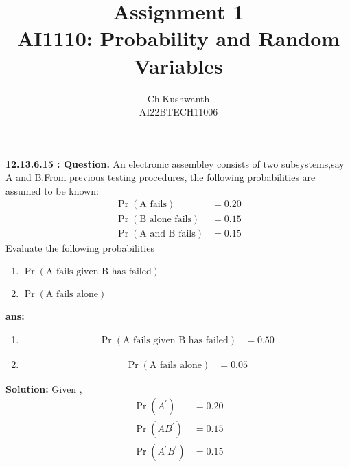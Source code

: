 \documentclass[journal,12pt,twocolumn]{IEEEtran}
\title{\textbf{Assignment 1}
\\ \textbf{AI1110:} Probability and Random Variables}
\author{Ch.Kushwanth
\\ AI22BTECH11006}
\providecommand{\pr}[1]{\ensuremath{\Pr\left(#1\right)}}
\theoremstyle{remark}
\begin{document}
\maketitle
\textbf{12.13.6.15 : Question.}
An electronic assembley consists of two subsystems,say A and B.From previous testing procedures, the following probabilities are assumed to be known:
\begin{align}
\pr{\text{A fails}}&=0.20
\\ \pr{\text{B alone fails}}&=0.15
\\ \pr{\text{A  and B fails}}&=0.15
\end{align}
 Evaluate the following probabilities
 \begin{enumerate}
 \item $\pr{\text{A fails given B has failed}}$
 \item $\pr{\text{A fails alone}}$
\end{enumerate}
 \textbf{ans:}
 \begin{enumerate}
 \item \begin{align}\pr{\text{A fails given B has failed}}&= 0.50
\end{align}
\item \begin{align}\pr{\text{A fails alone}}&=0.05 
 \end{align}
\end{enumerate}
 \textbf{Solution:}
 Given ,
 \begin{align}
 \pr{A^\prime} &= 0.20 \label{eq:tot}
 \\\pr{AB^ \prime}&=0.15 \label{eq:bot}
 \\\pr{A ^\prime B ^\prime}&=0.15 \label{eq:cot}
 \end{align} 
\end{document}
